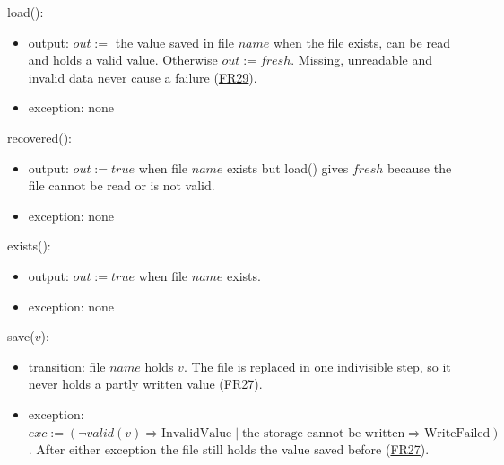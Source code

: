\documentclass[10pt, titlepage]{article}
\newcommand{\srsurl}{https://team-hindsight.github.io/ophthamology-game/SRS/SRS.pdf}
\newcommand{\srsitemref}[2]{\href{\srsurl\#nameddest=#1}{#2}}
\newcommand{\T}[1]{\mathit{#1}}          %
\newcommand{\out}{\mathit{out}}
\newcommand{\exc}{\mathit{exc}}
\newcommand{\true}{\mathit{true}}
\begin{document}
\begin{samepage}
\noindent load():
\begin{itemize}
\item output: $\out :=$ the value saved in file $\T{name}$ when the file
  exists, can be read and holds a valid value. Otherwise $\out := \T{fresh}$.
  Missing, unreadable and invalid data never cause a failure
  (\srsitemref{FR_CorruptData}{FR29}).
\item exception: none
\end{itemize}
\end{samepage}
\par\pagebreak[0]

\begin{samepage}
\noindent recovered():
\begin{itemize}
\item output: $\out := \true$ when file $\T{name}$ exists but load() gives
  $\T{fresh}$ because the file cannot be read or is not valid.
\item exception: none
\end{itemize}
\end{samepage}
\par\pagebreak[0]

\begin{samepage}
\noindent exists():
\begin{itemize}
\item output: $\out := \true$ when file $\T{name}$ exists.
\item exception: none
\end{itemize}
\end{samepage}
\par\pagebreak[0]

\begin{samepage}
\noindent save($v$):
\begin{itemize}
\item transition: file $\T{name}$ holds $v$. The file is replaced in one
  indivisible step, so it never holds a partly written value
  (\srsitemref{FR_PersistState}{FR27}).
\item exception: $\exc := (\neg\T{valid}(v) \Rightarrow \text{InvalidValue}
  \mid \text{the storage cannot be written} \Rightarrow \text{WriteFailed})$.
  After either exception the file still holds the value saved before
  (\srsitemref{FR_PersistState}{FR27}).
\end{itemize}
\end{samepage}
\par\pagebreak[0]
\end{document}
